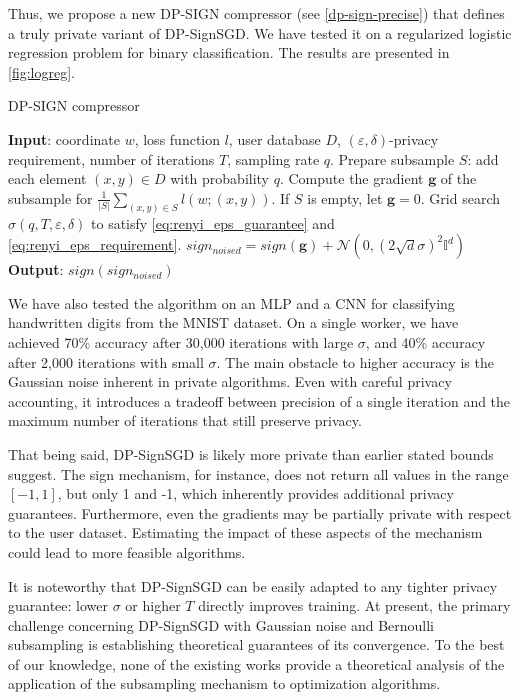 \documentclass[a4paper, 12pt]{article}
\newcommand{\eps}{\varepsilon}
\begin{document}
Thus, we propose a new DP-SIGN compressor (see \cref{dp-sign-precise}) that defines a truly private variant of DP-SignSGD. We have tested it on a regularized logistic regression problem for binary classification. The results are presented in \cref{fig:logreg}.


\newcommand{\gradg}{\boldsymbol{g}}
\begin{algorithm}
    \caption{DP-SIGN compressor}
    \label{dp-sign-precise}
    \begin{algorithmic}
        \STATE \textbf{Input}: coordinate $w$, loss function $l$, user database $D$, $(\eps, \delta)$-privacy requirement, number of iterations $T$, sampling rate $q$.
        \STATE Prepare subsample $S$: add each element $(x, y) \in D$ with probability $q$.
        \STATE Compute the gradient $\gradg$ of the subsample for $\frac{1}{|S|}\sum_{(x,y)\in S}l(w;(x,y))$. If $S$ is empty, let $\gradg = 0$.
        \STATE Grid search $\sigma(q, T, \eps, \delta)$ to satisfy \eqref{eq:renyi_eps_guarantee} and \eqref{eq:renyi_eps_requirement}.
        \STATE $sign_{noised} = sign(\gradg) + \mathcal{N}(0,(2\sqrt{d}\sigma)^2\mathbb{I}^d)$
        \STATE \textbf{Output}: $sign(sign_{noised})$
    \end{algorithmic}
\end{algorithm}

We have also tested the algorithm on an MLP and a CNN for classifying handwritten digits from the MNIST dataset. On a single worker, we have achieved 70\% accuracy after 30,000 iterations with large $\sigma$, and 40\% accuracy after 2,000 iterations with small $\sigma$. The main obstacle to higher accuracy is the Gaussian noise inherent in private algorithms. Even with careful privacy accounting, it introduces a tradeoff between precision of a single iteration and the maximum number of iterations that still preserve privacy.

That being said, DP-SignSGD is likely more private than earlier stated bounds suggest. The sign mechanism, for instance, does not return all values in the range $[-1,1]$, but only 1 and -1, which inherently provides additional privacy guarantees. Furthermore, even the gradients may be partially private with respect to the user dataset. Estimating the impact of these aspects of the mechanism could lead to more feasible algorithms.

It is noteworthy that DP-SignSGD can be easily adapted to any tighter privacy guarantee: lower $\sigma$ or higher $T$ directly improves training. At present, the primary challenge concerning DP-SignSGD with Gaussian noise and Bernoulli subsampling is establishing theoretical guarantees of its convergence. To the best of our knowledge, none of the existing works provide a theoretical analysis of the application of the subsampling mechanism to optimization algorithms.

\vspace{-1.6em}
\printbibliography[heading=bibliography]
\end{document}
